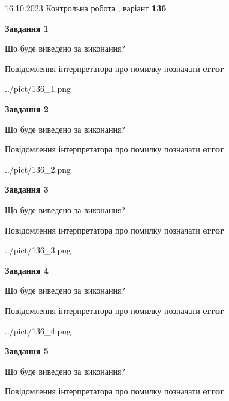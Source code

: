 \documentclass[12pt, ukrainian]{article}
\begin{document}
{\Large{16.10.2023 Контрольна робота , варіант  \No \textbf { 136 }\par}}
{
\begin {large}
{\begin {center}\textbf{Завдання 1}\end {center}}\par
Що буде виведено за виконання? \par
Повідомлення інтерпретатора про помилку позначати \textbf{error}

\begin{center}
	{../pict/136_1.png}
\end{center}
\newpage

{\begin {center}\textbf{Завдання 2}\end {center}}\par
Що буде виведено за виконання? \par
Повідомлення інтерпретатора про помилку позначати \textbf{error}

\begin{center}
	{../pict/136_2.png}
\end{center}
\newpage

{\begin {center}\textbf{Завдання 3}\end {center}}\par
Що буде виведено за виконання? \par
Повідомлення інтерпретатора про помилку позначати \textbf{error}

\begin{center}
	{../pict/136_3.png}
\end{center}
\newpage

{\begin {center}\textbf{Завдання 4}\end {center}}\par
Що буде виведено за виконання? \par
Повідомлення інтерпретатора про помилку позначати \textbf{error}

\begin{center}
	{../pict/136_4.png}
\end{center}
\newpage

{\begin {center}\textbf{Завдання 5}\end {center}}\par
Що буде виведено за виконання? \par
Повідомлення інтерпретатора про помилку позначати \textbf{error}


\end{large}}
\end{document}
